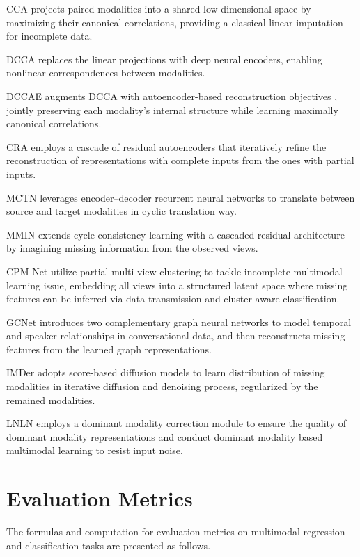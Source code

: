 \documentclass{article}
\begin{document}
CCA \cite{hotelling1992cca} projects paired modalities into a shared low-dimensional space by maximizing their canonical correlations, providing a classical linear imputation for incomplete data.

DCCA \cite{andrew2013dcca} replaces the linear projections with deep neural encoders, enabling nonlinear correspondences between modalities.

DCCAE \cite{wang2015dccae} augments DCCA with autoencoder-based reconstruction objectives \cite{bengio2006greedy}, jointly preserving each modality’s internal structure while learning maximally canonical correlations.

CRA \cite{tran2017cra} employs a cascade of residual autoencoders that iteratively refine the reconstruction of representations with complete inputs from the ones with partial inputs.

MCTN \cite{pham2019found} leverages encoder–decoder recurrent neural networks to translate between source and target modalities in cyclic translation way.

MMIN \cite{zhao2021missing} extends cycle consistency learning with a cascaded residual architecture by imagining missing information from the observed views.

CPM-Net \cite{zhang2022cpmnet} utilize partial multi-view clustering to tackle incomplete multimodal learning issue, embedding all views into a structured latent space where missing features can be inferred via data transmission and cluster-aware classification.

GCNet \cite{lian2023gcnet} introduces two complementary graph neural networks to model temporal and speaker relationships in conversational data, and then reconstructs missing features from the learned graph representations.

IMDer \cite{wang2023incomplete} adopts score-based diffusion models to learn distribution of missing modalities in iterative diffusion and denoising process, regularized by the remained modalities.

LNLN \cite{zhang2024towards} employs a dominant modality correction module to ensure the quality of dominant modality representations and conduct dominant modality based multimodal learning to resist input noise.

\section{Evaluation Metrics}  \label{appendix_metric}
The formulas and computation for evaluation metrics on multimodal regression and classification tasks are presented as follows.
\end{document}
